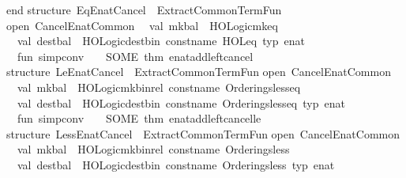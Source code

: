 \begin{isabellebody}
end\isanewline
\isanewline
structure\ Eq{\isacharunderscore}Enat{\isacharunderscore}Cancel\ {\isacharequal}\ ExtractCommonTermFun\isanewline
{\isacharparenleft}open\ Cancel{\isacharunderscore}Enat{\isacharunderscore}Common\isanewline
\ \ val\ mk{\isacharunderscore}bal\ {\isacharequal}\ HOLogic{\isachardot}mk{\isacharunderscore}eq\isanewline
\ \ val\ dest{\isacharunderscore}bal\ {\isacharequal}\ HOLogic{\isachardot}dest{\isacharunderscore}bin\ {\isacharat}{\isacharbraceleft}const{\isacharunderscore}name\ HOL{\isachardot}eq{\isacharbraceright}\ {\isacharat}{\isacharbraceleft}typ\ enat{\isacharbraceright}\isanewline
\ \ fun\ simp{\isacharunderscore}conv\ {\isacharunderscore}\ {\isacharunderscore}\ {\isacharequal}\ SOME\ {\isacharat}{\isacharbraceleft}thm\ enat{\isacharunderscore}add{\isacharunderscore}left{\isacharunderscore}cancel{\isacharbraceright}\isanewline
{\isacharparenright}\isanewline
\isanewline
structure\ Le{\isacharunderscore}Enat{\isacharunderscore}Cancel\ {\isacharequal}\ ExtractCommonTermFun\isanewline
{\isacharparenleft}open\ Cancel{\isacharunderscore}Enat{\isacharunderscore}Common\isanewline
\ \ val\ mk{\isacharunderscore}bal\ {\isacharequal}\ HOLogic{\isachardot}mk{\isacharunderscore}binrel\ {\isacharat}{\isacharbraceleft}const{\isacharunderscore}name\ Orderings{\isachardot}less{\isacharunderscore}eq{\isacharbraceright}\isanewline
\ \ val\ dest{\isacharunderscore}bal\ {\isacharequal}\ HOLogic{\isachardot}dest{\isacharunderscore}bin\ {\isacharat}{\isacharbraceleft}const{\isacharunderscore}name\ Orderings{\isachardot}less{\isacharunderscore}eq{\isacharbraceright}\ {\isacharat}{\isacharbraceleft}typ\ enat{\isacharbraceright}\isanewline
\ \ fun\ simp{\isacharunderscore}conv\ {\isacharunderscore}\ {\isacharunderscore}\ {\isacharequal}\ SOME\ {\isacharat}{\isacharbraceleft}thm\ enat{\isacharunderscore}add{\isacharunderscore}left{\isacharunderscore}cancel{\isacharunderscore}le{\isacharbraceright}\isanewline
{\isacharparenright}\isanewline
\isanewline
structure\ Less{\isacharunderscore}Enat{\isacharunderscore}Cancel\ {\isacharequal}\ ExtractCommonTermFun\isanewline
{\isacharparenleft}open\ Cancel{\isacharunderscore}Enat{\isacharunderscore}Common\isanewline
\ \ val\ mk{\isacharunderscore}bal\ {\isacharequal}\ HOLogic{\isachardot}mk{\isacharunderscore}binrel\ {\isacharat}{\isacharbraceleft}const{\isacharunderscore}name\ Orderings{\isachardot}less{\isacharbraceright}\isanewline
\ \ val\ dest{\isacharunderscore}bal\ {\isacharequal}\ HOLogic{\isachardot}dest{\isacharunderscore}bin\ {\isacharat}{\isacharbraceleft}const{\isacharunderscore}name\ Orderings{\isachardot}less{\isacharbraceright}\ {\isacharat}{\isacharbraceleft}typ\ enat{\isacharbraceright}\isanewline

\end{isabellebody}
